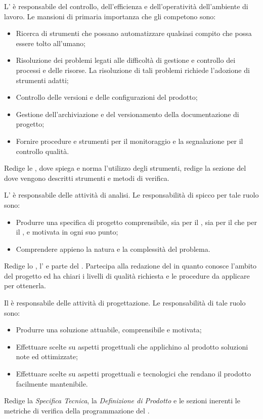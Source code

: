 \documentclass[12pt,a4paper]{article}
\begin{document}
L'\AM{} è responsabile del controllo, dell'efficienza e dell'operatività dell'ambiente di lavoro. Le mansioni di primaria importanza che gli competono sono:
\begin{itemize}
  \item Ricerca di strumenti che possano automatizzare qualsiasi compito che possa essere tolto all'umano;
  \item Risoluzione dei problemi legati alle difficoltà di gestione e controllo dei processi e delle risorse. La risoluzione di tali problemi richiede l'adozione di strumenti adatti;
  \item Controllo delle versioni e delle configurazioni del prodotto;
  \item Gestione dell'archiviazione e del versionamento della documentazione di progetto;
  \item Fornire procedure e strumenti per il monitoraggio e la segnalazione per il controllo qualità.
\end{itemize}
Redige le \NdP{}, dove spiega e norma l'utilizzo degli strumenti, redige la sezione del \PdQ{} dove vengono descritti strumenti e metodi di verifica.

L'\AN{} è responsabile delle attività di analisi. Le responsabilità di spicco per tale ruolo sono:
\begin{itemize}
  \item Produrre una specifica di progetto comprensibile, sia per il , sia per il \textit{} che per il \PG{}, e motivata in ogni suo punto;
  \item Comprendere appieno la natura e la complessità del problema.
\end{itemize}
Redige lo \SdF{}, l'\AdR{} e parte del \PdQ{}.
Partecipa alla redazione del \PdQ{} in quanto conosce l'ambito del progetto ed ha chiari i livelli di qualità richiesta e le procedure da applicare per ottenerla.

Il \PG{} è responsabile delle attività di progettazione. Le responsabilità di tale
ruolo sono:
\begin{itemize}
  \item Produrre una soluzione attuabile, comprensibile e motivata;
  \item Effettuare scelte su aspetti progettuali che applichino al prodotto soluzioni note ed ottimizzate;
  \item Effettuare scelte su aspetti progettuali e tecnologici che rendano il prodotto facilmente mantenibile.
\end{itemize}
Redige la \textit{Specifica Tecnica}, la \textit{Definizione di Prodotto} e le sezioni inerenti le metriche di verifica della programmazione del \PdQ{}.
\end{document}
